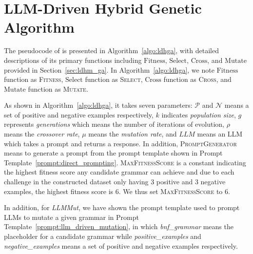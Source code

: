 \section{LLM-Driven Hybrid Genetic Algorithm}
\label{appendix:LDHGA}

The pseudocode of \NAME is presented in Algorithm~\ref{algo:ldhga}, with detailed descriptions of its primary functions including $\mathrm{Fitness}$, $\mathrm{Select}$, $\mathrm{Cross}$, and $\mathrm{Mutate}$ provided in Section~\ref{sec:ldhm_ga}. In Algorithm~\ref{algo:ldhga}, we note $\mathrm{Fitness}$ function as \textsc{Fitness}, $\mathrm{Select}$ function as \textsc{Select}, $\mathrm{Cross}$ function as \textsc{Cross}, and $\mathrm{Mutate}$ function as \textsc{Mutate}.

As shown in Algorithm~\ref{algo:ldhga}, it takes seven parameters: $\mathcal{P}$ and $\mathcal{N}$ means a set of positive and negative examples respectively, $k$ indicates \emph{population size}, $g$ represents \emph{generations} which means the number of iterations of evolution, $\rho$ means the \emph{crossover rate}, $\mu$ means the \emph{mutation rate}, and $LLM$ means an LLM which takes a prompt and returns a response. In addition, \textsc{PromptGenerator} means to generate a prompt from the prompt template shown in Prompt Template~\ref{prompt:direct_prompting}. \textsc{MaxFitnessScore} is a constant indicating the highest fitness score any candidate grammar can achieve and due to each challenge in the constructed dataset only having 3 positive and 3 negative examples, the highest fitness score is 6. We thus set \textsc{MaxFitnessScore} to 6.

In addition, for \textit{LLMMut}, we have shown the prompt template used to prompt LLMs to mutate a given grammar in Prompt Template~\ref{prompt:llm_driven_mutation}, in which \textit{bnf\_grammar} means the placeholder for a candidate grammar while \textit{positive\_examples} and \textit{negative\_examples} means a set of positive and negative examples respectively.

